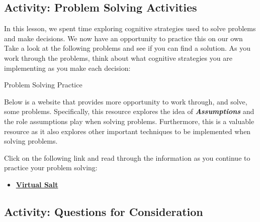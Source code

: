 \documentclass[
]{book}
\providecommand{\tightlist}{%
  \setlength{\itemsep}{0pt}\setlength{\parskip}{0pt}}
\begin{document}
\hypertarget{activity-problem-solving-activities}{%
\subsection*{Activity: Problem Solving Activities}\label{activity-problem-solving-activities}}

\begin{reflect}
In this lesson, we spent time exploring cognitive strategies used to solve problems and make decisions. We now have an opportunity to practice this on our own Take a look at the following problems and see if you can find a solution. As you work through the problems, think about what cognitive strategies you are implementing as you make each decision:

{Problem Solving Practice}

Below is a website that provides more opportunity to work through, and solve, some problems. Specifically, this resource explores the idea of \textbf{\emph{Assumptions}} and the role assumptions play when solving problems. Furthermore, this is a valuable resource as it also explores other important techniques to be implemented when solving problems.

Click on the following link and read through the information as you continue to practice your problem solving:

\begin{itemize}
\tightlist
\item
  \href{https://www.virtualsalt.com/crebook4.htm}{\textbf{Virtual Salt}}
\end{itemize}
\end{reflect}

\hypertarget{activity-questions-for-consideration}{%
\subsection*{Activity: Questions for Consideration}\label{activity-questions-for-consideration}}
\end{document}
